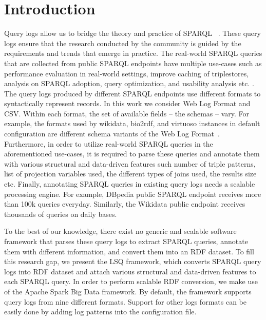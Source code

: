 
\section{Introduction}
Query logs allow us to bridge the theory and practice of SPARQL ~\cite{MartensT19}. These query logs ensure that the research conducted by the community is guided by the requirements and trends that emerge in practice.
The real-world SPARQL queries that are collected from public SPARQL endpoints have multiple use-cases such as performance evaluation in real-world settings, improve caching of triplestores, analysis on SPARQL adoption, query optimization, and usability analysis etc. \cite{stadleralsq}. The query logs produced by different SPARQL endpoints use different formats to syntactically represent records. In this work we consider Web Log Format and CSV. Within each format, the set of available fields -- the schemas -- vary. For example, the formats used by wikidata, bio2rdf, and virtuoso instances in default configuration are different schema variants of the Web Log Format~\cite{stadleralsq, SaleemAHMN15}.
Furthermore, in order to utilize real-world SPARQL queries in the aforementioned use-cases, it is required to parse these queries and annotate them with various structural and data-driven features such number of triple patterns, list of projection variables used, the different types of joins used, the results size etc. Finally, annotating SPARQL queries in existing query logs needs a scalable processing engine. For example, DBpedia public SPARQL endpoint receives more than 100k queries everyday. Similarly, the Wikidata public endpoint receives thousands of queries on daily bases. 

To the best of our knowledge, there exist no generic and scalable software framework that parses these query logs to extract SPARQL queries, annotate them with different information, and convert them into an RDF dataset. 
To fill this research gap, we present the LSQ framework, which converts
SPARQL query logs into RDF dataset and attach various structural and data-driven features to each SPARQL query. In order to perform scalable RDF conversion, we make use of the Apache Spark Big Data framework. By default, the framework supports query logs from nine different formats. Support for other logs formats can be easily done by adding log patterns into the configuration file.  

